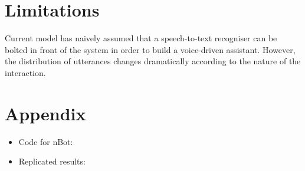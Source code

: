 \documentclass[letterpaper] {article} %
\begin{document}
\section{Limitations}

Current model has naively assumed that a speech-to-text recogniser can be bolted in front of the system in order to build a voice-driven assistant. However, the distribution of utterances changes dramatically according to the nature of the interaction. 





\section{Appendix}
\begin{itemize}
	\item Code for nBot: 
	\item Replicated results:
\end{itemize}
\end{document}
